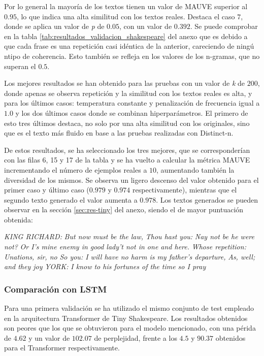 \documentclass[11pt]{book}
\begin{document}
Por lo general la mayoría de los textos tienen un valor de MAUVE superior al $0.95$, lo que indica una alta similitud con los textos reales. Destaca el caso $7$, donde se aplica un valor de \textit{p} de $0.05$, con un valor de $0.392$. Se puede comprobar en la tabla \ref{tab:resultados_validacion_shakespeare} del anexo que es debido a que cada frase es una repetición casi idéntica de la anterior, careciendo de ningú ntipo de coherencia. Esto también se refleja en los valores de los n-gramas, que no superan el $0.5$. 

Los mejores resultados se han obtenido para las pruebas con un valor de \textit{k} de $200$, donde apenas se observa repetición y la similitud con los textos reales es alta, y para los últimos casos: temperatura constante y penalización de frecuencia igual a $1.0$ y los dos últimos casos donde se combinan hiperparámetros. El primero de esto tres últimos destaca, no solo por una alta similitud con los originales, sino que es el texto más fluido en base a las pruebas realizadas con Distinct-n. 

De estos resultados, se ha seleccionado los tres mejores, que se corresponderían con las filas 6, 15 y 17 de la tabla y se ha vuelto a calcular la métrica MAUVE incrementando el número de ejemplos reales a $10$, aumentando también la diversidad de los mismos. Se observa un ligero descenso del valor obtenido para el primer caso y último caso ($0.979$ y $0.974$ respectivamente), mientras que el segundo texto generado el valor aumenta a $0.978$. Los textos generados se pueden observar en la sección \ref{sec:res-tiny} del anexo, siendo el de mayor puntuación obtenida: 

\textit{KING RICHARD:}
\textit{But now must be the law,}
\textit{Thou hast you:}
\textit{Nay not be he were not?}
\textit{Or I's mine enemy in good lady't not in one and here.}
\textit{Whose repetition:}
\textit{Unations, sir, no}
\textit{So you: I will have no harm is my father's departure,}
\textit{As, well; and they joy}
\textit{YORK:}
\textit{I know to his fortunes of the time so I pray}


\subsubsection{Comparación con LSTM}

Para una primera validación se ha utilizado el mismo conjunto de test empleado en la arquitectura Transformer de Tiny Shakespeare. Los resultados obtenidos son peores que los que se obtuvieron para el modelo mencionado, con una périda de $4.62$ y un valor de $102.07$ de perplejidad, frente a los $4.5$ y $90.37$ obtenidos para el Transformer respectivamente.
\end{document}
